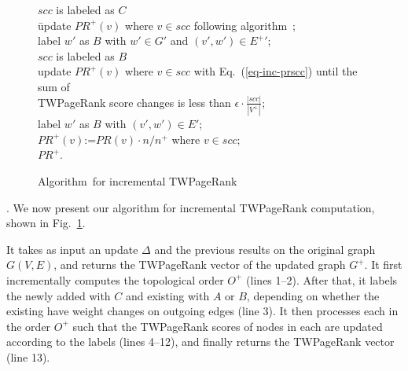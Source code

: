\begin{figure}[tb!]
\begin{center}
{\begin{minipage}{3.36in}
{%
\icc\>\> \If $scc$ is labeled as $C$ \Then \\
\icc\>\>\hspace{3ex}\= update $PR^+(v)$ where $v\in scc$ following algorithm~\twprscc; \\
\icc\>\>\> label \scc $w'$ as $B$ with $w'\in G'$ and $(v', w')\in E^+{'}$;\\
\icc\>\> \Else \If $scc$ is labeled as $B$ \Then \\
\icc\>\>\> update $PR^+(v)$ where $v\in scc$ with Eq.~(\ref{eq-inc-prscc}) until the sum of \\ \hspace{8ex} TWPageRank score changes is less than $\epsilon\cdot \frac{|scc|}{|V^+|}$; \\
\icc\>\>\> label \scc $w'$ as $B$ with $(v',w')\in E'$;\\
\icc\>\> \Else $PR^+(v)$:=$PR(v)\cdot {n}/{n^+}$ where $v\in scc$; \\
\icc\> \Return $PR^+$.
}
\vspace{-2.5ex} \myhrule
\end{minipage}
}
\end{center}
\vspace{-3ex}
\caption{\small Algorithm~\inctwprscc for incremental TWPageRank} \label{alg-inctwprscc}
\vspace{-4ex}
\end{figure}

. We now present our algorithm for incremental TWPageRank  computation, shown in Fig.~\ref{alg-inctwprscc}.


It takes as input an update $\Delta$ and the previous results on the original graph $G(V, E)$, and returns the TWPageRank vector of the updated graph $G^+$. It first incrementally computes the topological order $O^+$
(lines 1--2). %
%
After that, it labels the newly added \sccs with $C$ and existing \sccs with $A$ or $B$, depending on whether the existing \sccs have weight changes on outgoing edges (line 3).
%
It then processes each \scc in the order $O^+$ such that the TWPageRank scores of nodes in each \scc are updated according to the labels (lines 4--12), and finally returns the TWPageRank vector (line 13).
%
%

